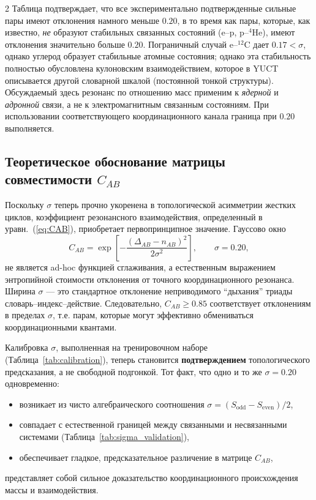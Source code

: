 \documentclass[11pt,a4paper]{article}
\begin{document}
\begin{multicols}{2}
		Таблица подтверждает, что все экспериментально подтвержденные сильные пары имеют отклонения намного меньше $0.20$, в то время как пары, которые, как известно, \emph{не} образуют стабильных связанных состояний (e--p, p--$^4$He), имеют отклонения значительно больше $0.20$. Пограничный случай e--$^{12}$C дает $0.17 < \sigma$, однако углерод образует стабильные атомные состояния; однако эта стабильность полностью обусловлена кулоновским взаимодействием, которое в YUCT описывается другой словарной шкалой (постоянной тонкой структуры). Обсуждаемый здесь резонанс по отношению масс применим к \emph{ядерной} и \emph{адронной} связи, а не к электромагнитным связанным состояниям. При использовании соответствующего координационного канала граница при $0.20$ выполняется.
		
		\subsection{Теоретическое обоснование матрицы совместимости \(C_{AB}\)}
		
		Поскольку $\sigma$ теперь прочно укоренена в топологической асимметрии жестких циклов, коэффициент резонансного взаимодействия, определенный в уравн.~(\ref{eq:CAB}), приобретает первопринципное значение. Гауссово окно
		\[
		C_{AB} = \exp\!\left[ -\frac{(\Delta_{AB} - n_{AB})^2}{2\sigma^2} \right],\qquad \sigma = 0.20,
		\]
		не является ad-hoc функцией сглаживания, а естественным выражением энтропийной стоимости отклонения от точного координационного резонанса. Ширина $\sigma$ — это стандартное отклонение неприводимого ``дыхания'' триады словарь–индекс–действие. Следовательно, $C_{AB} \ge 0.85$ соответствует отклонениям в пределах $\sigma$, т.е. парам, которые могут эффективно обмениваться координационными квантами.
		
		Калибровка $\sigma$, выполненная на тренировочном наборе (Таблица~\ref{tab:calibration}), теперь становится \textbf{подтверждением} топологического предсказания, а не свободной подгонкой. Тот факт, что одно и то же $\sigma = 0.20$ одновременно:
		\begin{itemize}
			\item возникает из чисто алгебраического соотношения $\sigma = (S_{\mathrm{odd}} - S_{\mathrm{even}})/2$,
			\item совпадает с естественной границей между связанными и несвязанными системами (Таблица~\ref{tab:sigma_validation}),
			\item обеспечивает гладкое, предсказательное различение в матрице $C_{AB}$,
		\end{itemize}
		представляет собой сильное доказательство координационного происхождения массы и взаимодействия.
		

\end{multicols}
\end{document}
